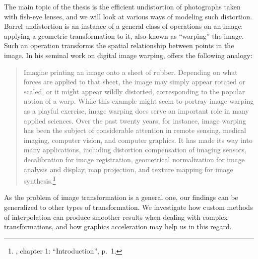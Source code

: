 \documentclass[english,12pt]{ifimaster}
\begin{document}
The main topic of the thesis is the efficient undistortion of
photographs taken with fish-eye lenses, and we will look at various
ways of modeling such distortion. Barrel undistortion is an
instance of a general class of operations on an image: applying a
geometric transformation to it, also known as ``warping'' the image.
Such an operation transforms the spatial relationship between points
in the image. In his seminal work on digital image warping,
\citet{wolberg90:-digital-image-warp} offers the following analogy:
\begin{quote}
  Imagine printing an image onto a sheet of rubber. Depending on what
  forces are applied to that sheet, the image may simply appear
  rotated or scaled, or it might appear wildly distorted,
  corresponding to the popular notion of a warp. While this example
  might seem to portray image warping as a playful exercise, image
  warping does serve an important role in many applied sciences. Over
  the past twenty years, for instance, image warping has been the
  subject of considerable attention in remote sensing, medical
  imaging, computer vision, and computer graphics. It has made its way
  into many applications, including distortion compensation of imaging
  sensors, decalibration for image registration, geometrical
  normalization for image analysis and display, map projection, and
  texture mapping for image
  synthesis.\footnote{\citet{wolberg90:-digital-image-warp}, chapter
    1: ``Introduction'', p.~1.}
\end{quote}
As the problem of image transformation is a general one, our findings
can be generalized to other types of transformation. We investigate
how custom methods of interpolation can produce smoother results when
dealing with complex transformations, and how graphics acceleration
may help us in this regard.




\end{document}
